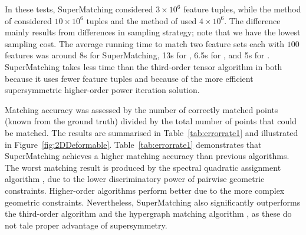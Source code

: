 In these tests, SuperMatching considered $3\times 10^6$ feature tuples, while the method of \cite{Duchenne09} considered $10\times 10^6$ tuples  and the method of \cite{Zass08} used $4\times 10^6$.
The difference mainly results from differences in sampling strategy; note that we have the lowest  sampling cost.
The average running time to match two feature sets each with $100$ features was around 8s for SuperMatching, 13s for \cite{Duchenne09}, 6.5s for \cite{Zass08}, and 5s for \cite{Cour06}.
SuperMatching takes less time than the third-order tensor algorithm in \cite{Duchenne09} both because it uses fewer feature tuples and because of the more efficient supersymmetric higher-order power iteration solution.

Matching accuracy was assessed by the number of correctly matched points (known from the  ground truth) divided by the total number of points that could be matched.
The results are summarised in Table~\ref{tab:errorrate1} and illustrated in Figure~\ref{fig:2DDeformable}.
Table~\ref{tab:errorrate1} demonstrates that SuperMatching achieves a higher matching accuracy than previous algorithms.
The worst matching result is produced by the spectral quadratic assignment algorithm \cite{Cour06},
due to the lower discriminatory power of pairwise geometric constraints.
Higher-order algorithms perform better due to the more complex geometric constraints.
Nevertheless, SuperMatching also significantly outperforms the third-order algorithm \cite{Duchenne09} and the hypergraph matching algorithm \cite{Zass08},
as these do not tale proper advantage of supersymmetry.

